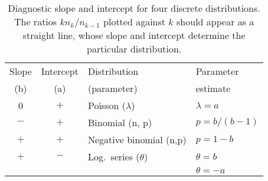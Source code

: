 \begin{table}[htb]
\caption[Diagnostic slope and intercept for four discrete distributions]{Diagnostic slope and
intercept for four discrete distributions.  The ratios $k n_k / n_{k-1}$ plotted
against $k$ should appear as a straight line, whose slope and intercept
determine the particular distribution.}
\label{tab:ordparm}
\begin{center}
\begin{tabular}{|ccll|}\hline
Slope & Intercept & Distribution & Parameter \\
(b)   & (a)       & (parameter)  &  estimate \\ \hline
0     &  $+$      &  Poisson (\(\lambda\)) & \(\lambda = a\)    \\
$-$   &  $+$      &  Binomial (n, p)       & \(p = b / (b-1)\)  \\
$+$   &  $+$      &  Negative binomial (n,p)      & \(p = 1 - b\)      \\
$+$   &  $-$      &  Log.\ series (\(\theta\)) & \(\theta =  b\) \\
      &      &                     &   \(\theta = - a\) \\ \hline
\end{tabular}
\end{center}
\end{table}

